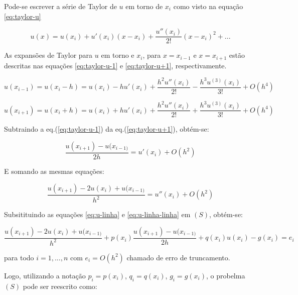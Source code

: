 Pode-se escrever a série de Taylor de $u$ em torno de $x_i$ como visto na equação \ref{eq:taylor-u}

\begin{equation} \label{eq:taylor-u}
u(x) = u(x_i) + u'(x_i)(x-x_i) + \dfrac{u''(x_i)}{2!}(x-x_i)^2 + ...
\end{equation}

As expansões de Taylor para $u$ em torno e $x_i$, para $x=x_{i-1}$ e $x=x_{i+1}$ estão descritas nas equações \ref{eq:taylor-u-1} e \ref{eq:taylor-u+1}, respectivamente.

\begin{equation} \label{eq:taylor-u-1}
u(x_{i-1}) = u(x_i-h) = u(x_i) - hu'(x_i) + \dfrac{h^2u''(x_i)}{2!} - \dfrac{h^3 u^{(3)}(x_i)}{3!} + O(h^4)
\end{equation}


\begin{equation} \label{eq:taylor-u+1}
u(x_{i+1}) = u(x_i+h) = u(x_i) + hu'(x_i) + \dfrac{h^2u''(x_i)}{2!} + \dfrac{h^3 u^{(3)}(x_i)}{3!} + O(h^4)
\end{equation}

Subtraindo a eq.(\ref{eq:taylor-u-1}) da eq.(\ref{eq:taylor-u+1}), obtém-se:

\begin{equation} \label{eq:u-linha}
\dfrac{u(x_{i+1}) - u(x_{i-1)}}{2h} = u'(x_i) + O(h^2)
\end{equation}

E somando as mesmas equações:

\begin{equation} \label{eq:u-linha-linha}
\dfrac{u(x_{i+1}) -2u(x_i) + u(x_{i-1)}}{h^2} = u''(x_i) + O(h^2)
\end{equation}

Subsitituindo as equações \ref{eq:u-linha} e \ref{eq:u-linha-linha} em $(S)$, obtém-se:

\begin{equation} \label{eq:u-linha-linha}
\dfrac{u(x_{i+1}) -2u(x_i) + u(x_{i-1)}}{h^2} + p(x_i)\dfrac{u(x_{i+1}) - u(x_{i-1)}}{2h}  + q(x_i)u(x_i) - g(x_i) = e_i
\end{equation}

para todo $i=1, ..., n$ com $e_i = O(h^2)$ chamado de erro de truncamento.
 
\par Logo, utilizando a notação $p_i = p(x_i)$, $q_i = q(x_i)$, $g_i = g(x_i)$, o probelma $(S)$ pode ser reescrito como:


